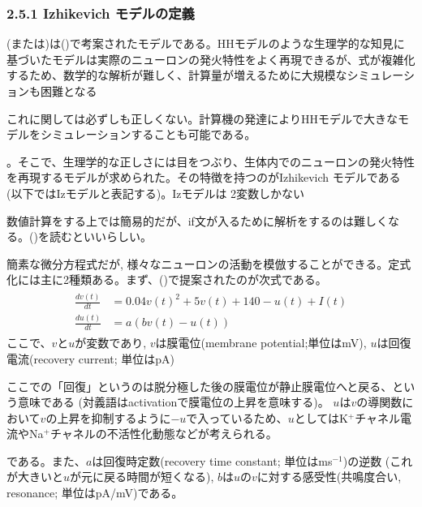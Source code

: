 \documentclass[letterpaper,10pt,english]{sphinxmanual}
\begin{document}
\subsubsection{2.5.1 Izhikevich モデルの定義}
\label{\detokenize{2-5_iz:id1}}
 (または)は()で考案されたモデルである。HHモデルのような生理学的な知見に基づいたモデルは実際のニューロンの発火特性をよく再現できるが、式が複雑化するため、数学的な解析が難しく、計算量が増えるために大規模なシミュレーションも困難となる%
\begin{footnote}[1]\sphinxAtStartFootnote
これに関しては必ずしも正しくない。計算機の発達によりHHモデルで大きなモデルをシミュレーションすることも可能である。
%
\end{footnote}。そこで、生理学的な正しさには目をつぶり、生体内でのニューロンの発火特性を再現するモデルが求められた。その特徴を持つのがIzhikevich モデルである (以下ではIzモデルと表記する)。Izモデルは 2変数しかない%
\begin{footnote}[2]\sphinxAtStartFootnote
数値計算をする上では簡易的だが、if文が入るために解析をするのは難しくなる。()を読むといいらしい。
%
\end{footnote}簡素な微分方程式だが, 様々なニューロンの活動を模倣することができる。定式化には主に2種類ある。まず、()で提案されたのが次式である。
\begin{equation*}
\begin{split}
\begin{align}
\frac{dv(t)}{dt}&=0.04v(t)^2 + 5v(t)+140-u(t)+I(t) \\
\frac{du(t)}{dt}&=a(bv(t)-u(t))
\end{align} 
\end{split}
\end{equation*}
ここで、\(v\)と\(u\)が変数であり, \(v\)は膜電位(membrane potential;単位はmV), \(u\)は回復電流(recovery current; 単位はpA)%
\begin{footnote}[3]\sphinxAtStartFootnote
ここでの「回復」というのは脱分極した後の膜電位が静止膜電位へと戻る、という意味である (対義語はactivationで膜電位の上昇を意味する)。
\(u\)は\(v\)の導関数において\(v\)の上昇を抑制するように\(-u\)で入っているため、\(u\)としてはK\(^+\)チャネル電流やNa\(^+\)チャネルの不活性化動態などが考えられる。
%
\end{footnote}である。また、\(a\)は回復時定数(recovery time constant; 単位はms\(^{-1}\))の逆数 (これが大きいと\(u\)が元に戻る時間が短くなる), \(b\)は\(u\)の\(v\)に対する感受性(共鳴度合い,  resonance; 単位はpA/mV)である。
\end{document}
